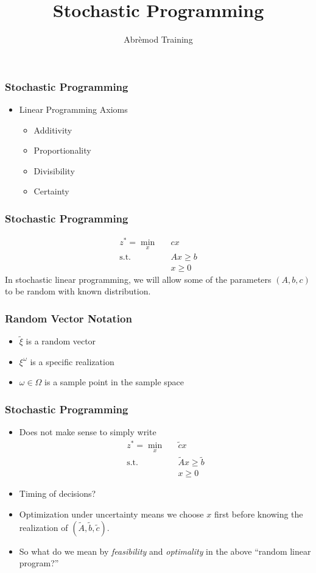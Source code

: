 \documentclass[12pt,handout]{beamer}
\title{Stochastic Programming}
\author{Abr\`emod Training}
\begin{document}
\begin{frame}
\titlepage
\end{frame}

\begin{frame}
\frametitle{Stochastic Programming}
\begin{itemize}
\item Linear Programming Axioms
\begin{itemize}
\item Additivity
\item Proportionality
\item Divisibility
\item {\color{red} Certainty}
\end{itemize}
\end{itemize}
\end{frame}

\begin{frame}
\frametitle{Stochastic Programming}
\begin{eqnarray}
z^* = \min_{x} && c x \nonumber \\
\mbox{s.t.} && Ax \ge b \nonumber \\
&& x \ge 0 \nonumber
\end{eqnarray}
In stochastic linear programming, we will allow some of the parameters $(A, b, c)$ to be random with known distribution.
\end{frame}

\begin{frame}
\frametitle{Random Vector Notation}
\begin{itemize}
\item $\tilde{\xi}$ is a random vector
\item $\xi^\omega$ is a specific realization
\item $\omega \in \Omega$ is a sample point in the sample space
\end{itemize}
\end{frame}

\begin{frame}
\frametitle{Stochastic Programming}
\begin{itemize}
\item Does not make sense to simply write
\begin{eqnarray}
z^* = \min_{x} && \tilde{c}x \nonumber \\
\mbox{s.t.} && \tilde{A}x \ge \tilde{b} \nonumber \\
&& x \ge 0 \nonumber
\end{eqnarray}
\item Timing of decisions?
\item Optimization under uncertainty means we choose $x$ first before knowing the realization of $(\tilde{A}, \tilde{b}, \tilde{c})$.
\item So what do we mean by {\em feasibility} and {\em optimality} in the above ``random linear program?''
\end{itemize}
\end{frame}
\end{document}
